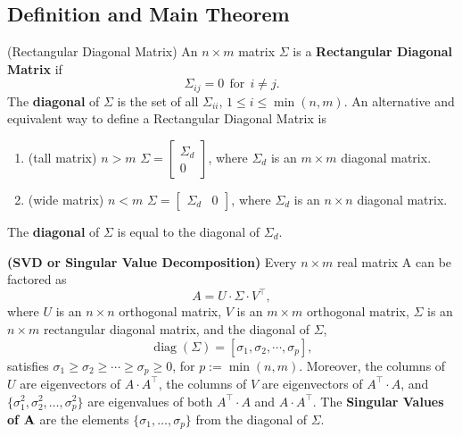 \subsection{Definition and Main Theorem}

\begin{definition}(Rectangular Diagonal Matrix)  An $n \times m$ matrix $\Sigma$ is a \textbf{Rectangular Diagonal Matrix} if $$ \Sigma_{ij} = 0~~\text{for}~~ i \ne j.$$
The \textbf{diagonal} of $\Sigma$ is the set of all $\Sigma_{ii}$, $1 \le i \le \min(n, m)$.
An alternative and equivalent way to define a Rectangular Diagonal Matrix is 
    \begin{enumerate}
    	\renewcommand{\labelenumi}{(\alph{enumi})}
\setlength{\itemsep}{.2cm}
        \item (tall matrix) $n > m$  \;\;\;  $\Sigma = \left[ \begin{array}{c} \Sigma_{d} \\ 0 \end{array} \right]$, where $\Sigma_{d}$ is an $m \times m$ diagonal matrix.
        \item (wide matrix) $n < m$ \;\;\; $\Sigma = \left[ \begin{array}{cc} \Sigma_{d} & 0 \end{array} \right]$,  where $\Sigma_{d}$ is an $n \times n$ diagonal matrix.
    \end{enumerate}
The \textbf{diagonal} of $\Sigma$ is equal to the diagonal of $ \Sigma_{d}$.
\end{definition}

\vspace*{.2cm}

\begin{thm} \textbf{(SVD or Singular Value Decomposition)}
Every $n \times m$ real matrix A can be factored as 
$$A = U \cdot \Sigma \cdot V^\top,$$
where $U$ is an $n \times n$ orthogonal matrix, $V$ is an $m \times m$ orthogonal matrix, $\Sigma$ is an $n \times m$ rectangular diagonal matrix, and the diagonal of $\Sigma$, 
$$\operatorname{diag}(\Sigma) = \left[ \sigma_1, \sigma_2, \dotsb , \sigma_p \right],$$
satisfies $ \sigma_1 \ge \sigma_2 \ge \dotsb  \ge \sigma_p \ge 0$, for $p:={\min}(n,m)$.
    Moreover, the columns of $U$ are eigenvectors of $A \cdot A^\top$, the columns of $V$ are eigenvectors of $A^\top \cdot A$, and $\{\sigma_1^2, \sigma_2^2, \ldots , \sigma_p^2\}$ are eigenvalues of both $A^\top \cdot A$ and $A \cdot A^\top$.
    The \textbf{Singular Values of ${\bf A}$} are the elements $\{\sigma_1, \ldots, \sigma_p \}$ from the diagonal of $\Sigma$. 
\end{thm}

